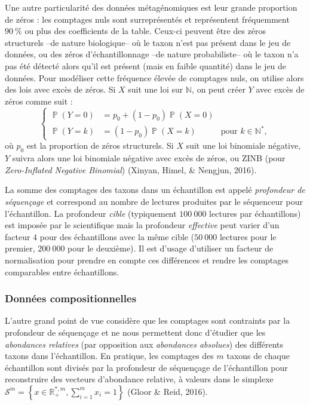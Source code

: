 \documentclass[12pt,a4paper]{reedthesis}
\newcommand \NN {\mathbb{N}}
\newcommand \RR {\mathbb{R}}
\DeclareMathOperator*{\prob}{\mathbb{P}}
\newcommand \PP [1]{\prob\left({#1}\right)}
\theoremstyle{definition}
\theoremstyle{definition}
\theoremstyle{definition}
\theoremstyle{remark}
\begin{document}
Une autre particularité des données métagénomiques est leur grande proportion de zéros : les comptages nuls sont surreprésentés et représentent fréquemment \(90~\%\) ou plus des coefficients de la table. Ceux-ci peuvent être des zéros structurels --de nature biologique-- où le taxon n'est pas présent dans le jeu de données, ou des zéros d'échantillonnage --de nature probabiliste-- où le taxon n'a pas été détecté alors qu'il est présent (mais en faible quantité) dans le jeu de données. Pour modéliser cette fréquence élevée de comptages nuls, on utilise alors des lois avec excès de zéros. Si \(X\) suit une loi sur \(\NN\), on peut créer \(Y\) avec excès de zéros comme suit :
\begin{equation*}
\left\{
\begin{aligned}
\PP{Y = 0} & = p_0 + (1-p_0) \PP{X = 0}\\
\PP{Y = k} & = (1-p_0) \PP{X = k} & \text{pour } k\in \NN^*,
\end{aligned}
\right.
\end{equation*}
où \(p_0\) est la proportion de zéros structurels. Si \(X\) suit une loi binomiale négative, \(Y\) suivra alors une loi binomiale négative avec excès de zéros, ou ZINB (pour \emph{Zero-Inflated Negative Binomial}) (Xinyan, Himel, \& Nengjun, 2016).

La somme des comptages des taxons dans un échantillon est appelé \emph{profondeur de séquençage} et correspond au nombre de lectures produites par le séquenceur pour l'échantillon. La profondeur \emph{cible} (typiquement \(100~000\) lectures par échantillons) est imposée par le scientifique mais la profondeur \emph{effective} peut varier d'un facteur \(4\) pour des échantillons avec la même cible (\(50~000\) lectures pour le premier, \(200~000\) pour le deuxième).
Il est d'usage d'utiliser un facteur de normalisation pour prendre en compte ces différences et rendre les comptages comparables entre échantillons.

\hypertarget{donnuxe9es-compositionnelles}{%
\subsubsection*{Données compositionnelles}\label{donnuxe9es-compositionnelles}}

L'autre grand point de vue considère que les comptages sont contraints par la profondeur de séquençage et ne nous permettent donc d'étudier que les \emph{abondances relatives} (par opposition aux \emph{abondances absolues}) des différents taxons dans l'échantillon. En pratique, les comptages des \(m\) taxons de chaque échantillon sont divisés par la profondeur de séquençage de l'échantillon pour reconstruire des vecteurs d'abondance relative, à valeurs dans le simplexe \(\mathcal{S}^m = \left\{x \in \RR_+^{*,m}, \sum_{i=1}^m x_i = 1 \right\}\) (Gloor \& Reid, 2016).
\end{document}
